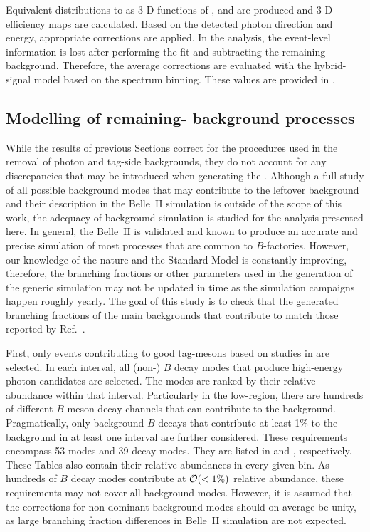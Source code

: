 Equivalent distributions to  as 3-D functions of \pRecoil, \pRecoilPhi and \pRecoilTheta are produced and 3-D efficiency maps are calculated.
Based on the detected photon direction and energy, appropriate corrections are applied.
In the \BtoXsgamma analysis, the event-level information is lost after performing the \Mbc fit and subtracting the remaining \BB background.
Therefore, the average corrections are evaluated with the \BtoXsgamma hybrid-signal model based on the \EB spectrum binning.
These values are provided in .

\subsection{Modelling of remaining-\texorpdfstring{\BB}{BB} background processes}\label{sec:remaining_bb_background_modelling}

While the results of previous Sections correct for the procedures used in the removal of photon and tag-side backgrounds, they do not account for any discrepancies that may be introduced when generating the \MC.
Although a full study of all possible background modes that may contribute to the leftover \BB background and their description in the Belle~II simulation is outside of the scope of this work, 
the adequacy of background simulation is studied for the analysis presented here.
In general, the Belle~II \MC is validated and known to produce an accurate and precise simulation of most processes that are common to $B$-factories.
However, our knowledge of the nature and the Standard Model is constantly improving, therefore, the branching fractions or other parameters used in the generation of the generic \BB simulation may not be updated in time as the simulation campaigns happen roughly yearly.
The goal of this study is to check that the generated branching fractions of the main backgrounds that contribute to \BtoXsgamma match those reported by Ref.~\cite{Workman:2022ynf}.

First, only events contributing to good tag-\B mesons based on studies in  are selected.
In each \EB interval, all (non-\BtoXsgamma) $B$ decay modes that produce high-energy photon candidates are selected.
The modes are ranked by their relative abundance within that \EB interval.
Particularly in the low-\EB region, there are hundreds of different $B$ meson decay channels that can contribute to the background.
Pragmatically, only background $B$ decays that contribute at least 1\% to the background in at least one \EB interval are further considered.
These requirements encompass 53 \Bp modes and 39 \Bz decay modes. 
They are listed in  and , respectively.
These Tables also contain their relative abundances in every given bin.
As hundreds of $B$ decay modes contribute at ${\cal O}(<1\%)$ relative abundance, these requirements may not cover all background modes. 
However, it is assumed that the corrections for non-dominant background modes should on average be unity, as large branching fraction differences in Belle~II simulation are not expected.


